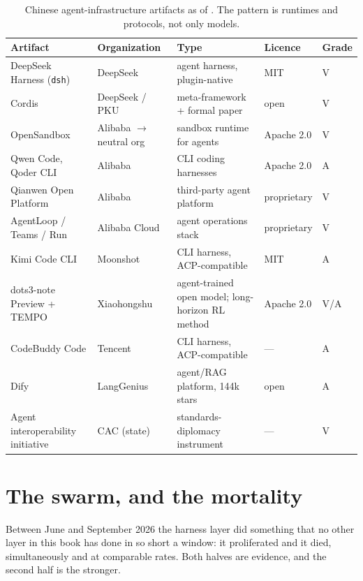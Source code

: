 \begin{table}[htbp]
  \centering
  \small
  \caption{Chinese agent-infrastructure artifacts as of \datafreeze. The pattern is runtimes and protocols, not only models.}
  \label{tab:harness}
  \begin{tabular}{p{34mm}p{22mm}p{38mm}p{22mm}p{16mm}}
    \toprule
    Artifact & Organization & Type & Licence & Grade \\
    \midrule
    DeepSeek Harness (\texttt{dsh}) & DeepSeek & agent harness, plugin-native & MIT & V \\
    Cordis & DeepSeek / PKU & meta-framework + formal paper & open & V \\
    OpenSandbox & Alibaba $\to$ neutral org & sandbox runtime for agents & Apache 2.0 & V \\
    Qwen Code, Qoder CLI & Alibaba & CLI coding harnesses & Apache 2.0 & A \\
    Qianwen Open Platform & Alibaba & third-party agent platform & proprietary & V \\
    AgentLoop / Teams / Run & Alibaba Cloud & agent operations stack & proprietary & V \\
    Kimi Code CLI & Moonshot & CLI harness, ACP-compatible & MIT & A \\
    dots3-note Preview + TEMPO & Xiaohongshu & agent-trained open model; long-horizon RL method & Apache 2.0 & V/A \\
    CodeBuddy Code & Tencent & CLI harness, ACP-compatible & --- & A \\
    Dify & LangGenius & agent/RAG platform, 144k stars & open & A \\
    \midrule
    Agent interoperability initiative & CAC (state) & standards-diplomacy instrument & --- & V \\
    \bottomrule
  \end{tabular}
\end{table}

\section{The swarm, and the mortality}
\label{sec:harness-swarm}

Between June and September 2026 the harness layer did something that no other layer in this book has done in so short a window: it proliferated and it died, simultaneously and at comparable rates. Both halves are evidence, and the second half is the stronger.

